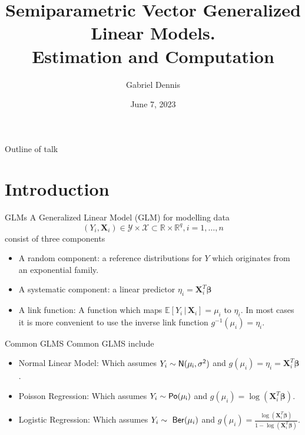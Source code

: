 \documentclass[9pt,notes=hide]{beamer}
\title{Semiparametric Vector Generalized Linear Models.\\ 
    \small{Estimation and Computation}
}
\author{Gabriel Dennis}
\date{June 7, 2023}
\newcommand{\vect}[1]{\boldsymbol #1}
\newcommand{\Po}{\sf Po}
\newcommand{\Nor}{\sf N}
\newcommand{\Em}{\mathbb E}
\newcommand{\R}{\mathbb R}
\newcommand{\gvn}{\,|\,}
\newcommand{\vbe}{\vect{\beta}}
\newcommand{\X}{\vect{X}}
\begin{document}
\maketitle

\begin{frame}{Outline of talk}
	\tableofcontents
\end{frame}




\section{Introduction}

\begin{frame}{GLMs}
	A Generalized Linear Model (GLM) for modelling data
	\[
		(Y_i, \X_i) \in \mathcal{Y} \times \mathcal{X} \subset \R \times \R^q, i = 1,\dots, n
	\]
	consist of three components \pause
	\pause[\thebeamerpauses]
	\begin{itemize}[<+->]
		\item A random component:  a reference distributions for
		      $Y$ which originates from an exponential family.
		\item A systematic component: a linear predictor $\eta_i = \X_i^T\vbe$
		\item A link function: A function which maps $\Em[Y_i \gvn \X_i] = \mu_i$ to $\eta_i$.
		      In most cases it is more convenient to use the inverse link function $g^{-1}(\mu_i) = \eta_i$.
	\end{itemize}

\end{frame}

\begin{frame}{Common GLMS}
	Common GLMS include \pause
	\pause[\thebeamerpauses]
	\begin{itemize}[<+->]
		\item  Normal Linear Model: Which assumes $Y_i \sim \Nor(\mu_i, \sigma^2)$ and $g(\mu_i) = \eta_i = \X_i^T\vbe$.
		\item  Poisson Regression: Which assumes $Y_i \sim \Po(\mu_i)$ and $g(\mu_i) = \log(\X_i^T\vbe)$.
		\item  Logistic Regression: Which assumes $Y_i \sim \ {\sf Ber}(\mu_i)$ and $g(\mu_i) = \frac{\log(\X_i^T\vbe)}{1 - \log(\X_i^T\vbe)}$.
	\end{itemize}
\end{frame}
\end{document}
